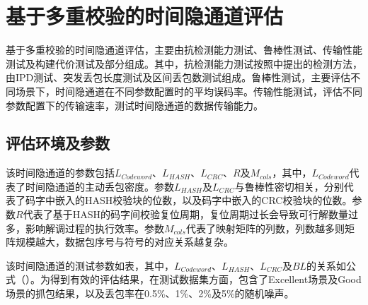 \section{基于多重校验的时间隐通道评估}
\label{chap:hash:result}

基于多重校验的时间隐通道评估，主要由抗检测能力测试、鲁棒性测试、传输性能测试及构建代价测试及部分组成。其中，抗检测能力测试按照中提出的检测方法，由IPD测试、突发丢包长度测试及区间丢包数测试组成。鲁棒性测试，主要评估不同场景下，时间隐通道在不同参数配置时的平均误码率。传输性能测试，评估不同参数配置下的传输速率，测试时间隐通道的数据传输能力。

\subsection{评估环境及参数}
\label{chap:hash:result:parameters}

该时间隐通道的参数包括$L_{Codeword}$、$L_{HASH}$、$L_{CRC}$、$R$及$M_{cols}$，其中，$L_{Codeword}$代表了时间隐通道的主动丢包密度。参数$L_{HASH}$及$L_{CRC}$与鲁棒性密切相关，分别代表了码字中嵌入的HASH校验块的位数，以及码字中嵌入的CRC校验块的位数。参数$R$代表了基于HASH的码字间校验复位周期，复位周期过长会导致可行解数量过多，影响解调过程的执行效率。参数$M_{cols}$代表了映射矩阵的列数，列数越多则矩阵规模越大，数据包序号与符号的对应关系越复杂。


该时间隐通道的测试参数如表，其中，$L_{Codeword}$、$L_{HASH}$、$L_{CRC}$及$BL$的关系如公式（）。为得到有效的评估结果，在测试数据集方面，包含了Excellent场景及Good场景的抓包结果，以及丢包率在0.5\%、1\%、2\%及5\%的随机噪声。

